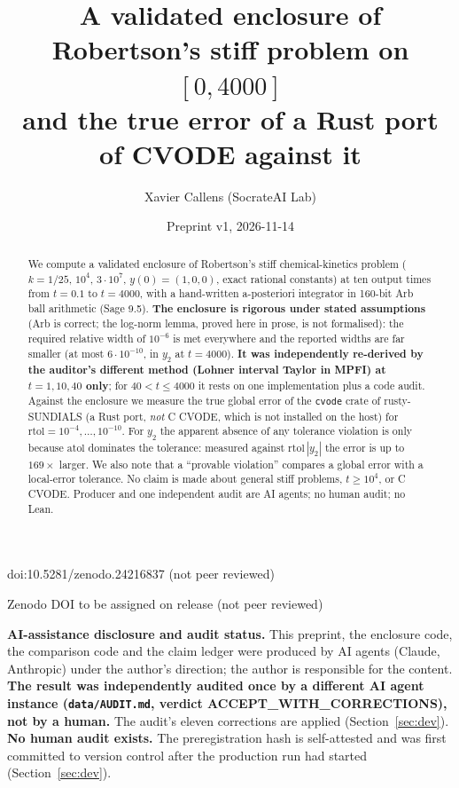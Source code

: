 \documentclass[11pt]{article}
\title{A validated enclosure of Robertson's stiff problem on $[0,4000]$\\
and the true error of a Rust port of CVODE against it}
\author{Xavier Callens (SocrateAI Lab)}
\date{Preprint v1, 2026-11-14}
\theoremstyle{remark}
\begin{document}
\maketitle
\begin{center}\small doi:10.5281/zenodo.24216837 \quad (not peer reviewed)\end{center}


\begin{center}\small Zenodo DOI to be assigned on release \quad (not peer reviewed)\end{center}

\noindent\textbf{AI-assistance disclosure and audit status.} This preprint, the enclosure code, the comparison code and the claim ledger
were produced by AI agents (Claude, Anthropic) under the author's direction; the author is responsible for the content.
\textbf{The result was independently audited once by a different AI agent instance (\texttt{data/AUDIT.md}, verdict ACCEPT\_WITH\_CORRECTIONS), not by a human.}
The audit's eleven corrections are applied (Section~\ref{sec:dev}). \textbf{No human audit exists.} The preregistration hash is self-attested and
was first committed to version control after the production run had started (Section~\ref{sec:dev}).

\begin{abstract}
We compute a validated enclosure of Robertson's stiff chemical-kinetics problem ($k=1/25,\,10^4,\,3\cdot10^7$, $y(0)=(1,0,0)$, exact rational constants) at ten output times from $t=0.1$ to $t=4000$, with a hand-written a-posteriori integrator in 160-bit Arb ball arithmetic (Sage 9.5).
\textbf{The enclosure is rigorous under stated assumptions} (Arb is correct; the log-norm lemma, proved here in prose, is not formalised): the required relative width of $10^{-6}$ is met everywhere and the reported widths are far smaller (at most $6\cdot10^{-10}$, in $y_2$ at $t=4000$).
\textbf{It was independently re-derived by the auditor's different method (Lohner interval Taylor in MPFI) at $t=1,10,40$ only}; for $40<t\le4000$ it rests on one implementation plus a code audit.
Against the enclosure we measure the true global error of the \texttt{cvode} crate of rusty-SUNDIALS (a Rust port, \emph{not} C CVODE, which is not installed on the host) for $\mathrm{rtol}=10^{-4},\dots,10^{-10}$.
For $y_2$ the apparent absence of any tolerance violation is only because $\mathrm{atol}$ dominates the tolerance: measured against $\mathrm{rtol}\,|y_2|$ the error is up to $169\times$ larger.
We also note that a ``provable violation'' compares a global error with a local-error tolerance.
No claim is made about general stiff problems, $t\ge10^4$, or C CVODE. Producer and one independent audit are AI agents; no human audit; no Lean.
\end{abstract}
\end{document}
